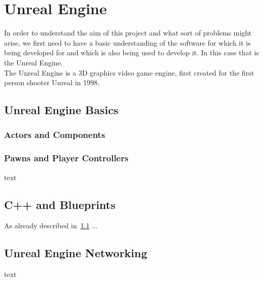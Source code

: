 \chapter{Unreal Engine}\label{chp:Grundlageb}
In order to understand the aim of this project and what sort of problems might arise, we first need to have a basic understanding of the software for which it is being developed for and which is also being used to develop it. In this case that is the Unreal Engine.\\

The Unreal Engine is a 3D graphics video game engine, first created for the first person shooter Unreal in 1998.

\section{Unreal Engine Basics}\label{sec:Grundlage1}
\subsection{Actors and Components}
\subsection{Pawns and Player Controllers}
text
\section{C++ and Blueprints}
As already described in~\ref{sec:Grundlage1} ...
\section{Unreal Engine Networking}
text